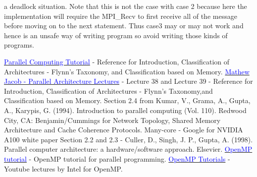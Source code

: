 \documentclass[12pt]{article}
\newcommand{\weblink}[2]{\href{#1}{\textcolor{blue}{#2}}}
\begin{document}
a deadlock situation. Note that this is not the case with case 2 because here the implementation will require the MPI\_Recv to first receive all of the message before moving on to the next statement. Thus case3 may or may not work and hence is an unsafe way of writing program so avoid writing those kinds of programs.












    









\newpage

\begin{thebibliography}{9}
    \weblink{http://www.llnl.gov/computing/tutorials/parallel_comp/}{Parallel Computing Tutorial} - Reference for Introduction, Classification of Architectures - Flynn's Taxonomy, and Classification based on Memory.
    \weblink{https://youtu.be/-yMWgtTeQgY?si=_PIhzFH7zZTydzcM}{Mathew Jacob - Parallel Architecture Lectures} - Lecture 38 and Lecture 39 - Reference for Introduction, Classification of Architectures - Flynn's Taxonomy,and Classification based on Memory.
    Section 2.4 from Kumar, V., Grama, A., Gupta, A., Karypis, G. (1994). Introduction to parallel computing (Vol. 110). Redwood City, CA: Benjamin/Cummings for Network Topology, Shared Memory Architecture and Cache Coherence Protocols.
    Many-core - Google for NVIDIA A100 white paper
    Section 2.2 and 2.3 - Culler, D., Singh, J. P., Gupta, A. (1998). Parallel computer architecture: a hardware/software approach. Elsevier.
    \weblink{https://hpc-tutorials.llnl.gov/openmp/}{OpenMP tutorial} - OpenMP tutorial for parallel programming.
    \weblink{https://www.youtube.com/watch?v=nE-xN4Bf8XI&list=PLLX-Q6B8xqZ8n8bwjGdzBJ25X2utwnoEG}{OpenMP Tutorials} - Youtube lectures by Intel for OpenMP.

\end{thebibliography}
\end{document}
